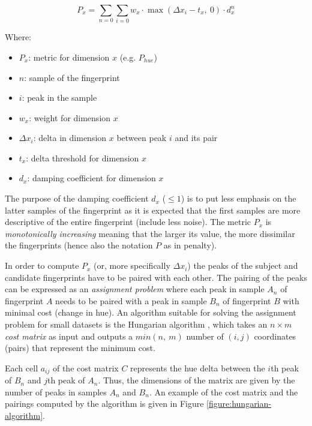 \documentclass[thesis.tex]{subfiles}
\begin{document}
\begin{equation}
\label{equation:similarity-metric}
	P_x = \sum \limits_{n=0} \sum \limits_{i=0} { { w_x \cdot \max (\Delta{x_i}-t_x,\ 0) \cdot d_x^n } }
\end{equation}

Where:
\begin{itemize}[label=]
	\setlength\itemsep{0.10em}
    \item $P_x$: metric for dimension $x$ (e.g. $P_{hue}$)
    \item $n$: sample of the fingerprint
    \item $i$: peak in the sample
    \item $w_x$: weight for dimension $x$
    \item $\Delta{x_i}$: delta in dimension $x$ between peak $i$ and its pair
    \item $t_x$: delta threshold for dimension $x$
    \item $d_x$: damping coefficient for dimension $x$
\end{itemize}

\noindent The purpose of the damping coefficient $d_x$ ($\leq 1$) is to put less emphasis on the latter samples of the fingerprint as it is expected that the first samples are more descriptive of the entire fingerprint (include less noise). The metric $P_x$ is \emph{monotonically increasing} meaning that the larger its value, the more dissimilar the fingerprints (hence also the notation $P$ as in penalty).

In order to compute $P_x$ (or, more specifically $\Delta{x_i}$) the peaks of the subject and candidate fingerprints have to be paired with each other. The pairing of the peaks can be expressed as an \emph{assignment problem} where each peak in sample $A_n$ of fingerprint $A$ needs to be paired with a peak in sample $B_n$ of fingerprint $B$ with minimal cost (change in hue). An algorithm suitable for solving the assignment problem for small datasets is the Hungarian algorithm \cite{hungarian_algorithm}, which takes an $n \times m$ \emph{cost matrix} as input and outputs a $min (n,\ m)$ number of $(i, j)$ coordinates (pairs) that represent the minimum cost.

Each cell $a_{ij}$ of the cost matrix $C$ represents the hue delta between the $i$th peak of $B_n$ and $j$th peak of $A_n$. Thus, the dimensions of the matrix are given by the number of peaks in samples $A_n$ and $B_n$. An example of the cost matrix and the pairings computed by the algorithm is given in Figure \ref{figure:hungarian-algorithm}.
\end{document}
